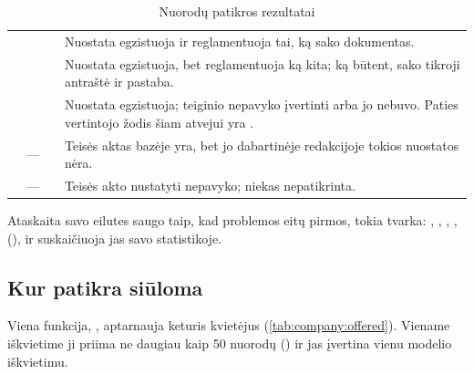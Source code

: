 \begin{table}[H]
\caption{Nuorodų patikros rezultatai}\label{tab:company:outcomes}
\begin{tabularx}{\textwidth}{@{}L{27mm}L{27mm}L{30mm}Y@{}}
\toprule
{} &  &  &  \\
\midrule
{} &  &  & Nuostata egzistuoja ir reglamentuoja tai, ką sako
  dokumentas. \\
 &  &  & Nuostata egzistuoja, bet reglamentuoja ką
  kita; ką būtent, sako tikroji antraštė ir pastaba. \\
 &  &  & Nuostata egzistuoja; teiginio nepavyko
  įvertinti arba jo nebuvo. Paties vertintojo žodis šiam atvejui yra . \\
 & --- &  & Teisės aktas bazėje yra, bet jo dabartinėje
  redakcijoje tokios nuostatos nėra. \\
 & --- &  & Teisės akto nustatyti nepavyko;
  niekas nepatikrinta. \\
\bottomrule
\end{tabularx}
\end{table}

Ataskaita savo eilutes saugo taip, kad problemos eitų pirmos, tokia tvarka: ,
, , ,  (), ir
suskaičiuoja jas savo statistikoje.

\subsection{Kur patikra siūloma}\label{sec:company:offered}

Viena funkcija, , aptarnauja keturis kvietėjus (\cref{tab:company:offered}).
Viename iškvietime ji priima ne daugiau kaip 50 nuorodų () ir jas įvertina vienu
modelio iškvietimu.

